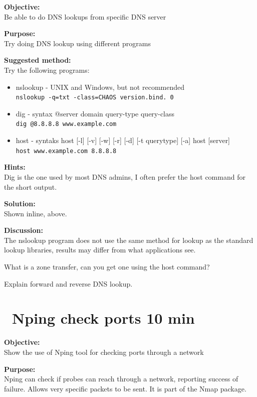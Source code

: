 \documentclass[a4paper,11pt,notitlepage]{report}
\begin{document}
{\bf Objective:}\\
Be able to do DNS lookups from specific DNS server

{\bf Purpose:}\\
Try doing DNS lookup using different programs

{\bf Suggested method:}\\
Try the following programs:
\begin{itemize}
\item nslookup - UNIX and Windows, but not recommended\\
\verb+nslookup -q=txt -class=CHAOS version.bind. 0+
\item dig - syntax @server domain query-type query-class\\
\verb+dig @8.8.8.8 www.example.com+
\item host - syntaks host [-l] [-v] [-w] [-r] [-d] [-t querytype] [-a] host [server]\\
\verb+host www.example.com 8.8.8.8+
\end{itemize}

{\bf Hints:}\\
Dig is the one used by most DNS admins, I often prefer the host command for the short output.

{\bf Solution:}\\
Shown inline, above.

{\bf Discussion:}\\
The nslookup program does not use the same method for lookup as the standard lookup libraries, results may differ from what applications see.

What is a zone transfer, can you get one using the host command?

Explain forward and reverse DNS lookup.




\chapter{\faExclamationTriangle\ Nping check ports 10 min}
\label{ex:nping-tcp}
{\bf Objective:} \\
Show the use of Nping tool for checking ports through a network

{\bf Purpose:}\\
Nping can check if probes can reach through a network, reporting success of failure. Allows very specific packets to be sent. It is part of the Nmap package.
\end{document}

